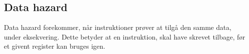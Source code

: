 \subsection{Data hazard}
Data hazard forekommer, når instruktioner prøver at tilgå den samme data, under eksekvering.
Dette betyder at en instruktion, skal have skrevet tilbage, før et givent register kan bruges igen.